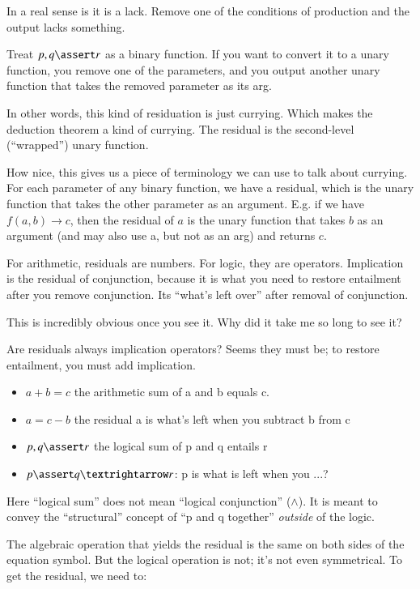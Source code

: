 \documentclass{article}
\begin{document}
In a real sense is it is a lack. Remove one of the conditions of
production and the output lacks something.

Treat \(p,q\linfer r\) as a binary function. If you want to convert it
to a unary function, you remove one of the parameters, and you output
another unary function that takes the removed parameter as its arg.

In other words, this kind of residuation is just currying. Which makes
the deduction theorem a kind of currying. The residual is the
second-level (``wrapped'') unary function.

How nice, this gives us a piece of terminology we can use to talk
about currying. For each parameter of any binary function, we have a
residual, which is the unary function that takes the other parameter
as an argument. E.g. if we have \(f(a,b)→c\), then the residual of
\(a\) is the unary function that takes \(b\) as an argument (and may
also use a, but not as an arg) and returns \(c\).

For arithmetic, residuals are numbers. For logic, they are operators.
Implication is the residual of conjunction, because it is what you
need to restore entailment after you remove conjunction. Its ``what's
left over'' after removal of conjunction.

This is incredibly obvious once you see it. Why did it take me so long
to see it?

Are residuals always implication operators? Seems they must be; to
restore entailment, you must add implication.

\begin{itemize}
\item \(a + b = c\) the arithmetic sum of a and b equals c.
\item \(a = c - b\) the residual a is what's left when you subtract b from c
\item \(p,q\linfer r\) the logical sum of p and q entails r
\item \(p\linfer q→r\): p is what is left when you ...?
\end{itemize}

Here ``logical sum'' does not mean ``logical conjunction''
(\(\land\)). It is meant to convey the ``structural'' concept of ``p and
q together'' \textit{outside} of the logic.

The algebraic operation that yields the residual is the same on both
sides of the equation symbol. But the logical operation is not; it's
not even symmetrical.  To get the residual, we need to:
\end{document}
